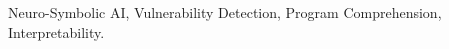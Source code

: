 \begin{abstract}

\end{abstract}

\begin{IEEEkeywords}
Neuro-Symbolic AI, Vulnerability Detection, Program Comprehension, Interpretability.
\end{IEEEkeywords}